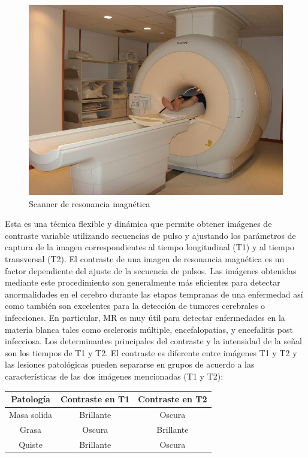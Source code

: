 \begin{figure}[h!]
\centering
\includegraphics[scale=0.3]{images/scanner.jpg}
\caption{Scanner de resonancia magnética}
\label{fig:scanner:mri}
\end{figure}

Esta es una técnica flexible y dinámica que permite obtener imágenes de contraste variable utilizando secuencias de pulso y ajustando los parámetros de captura de la imagen correspondientes al tiempo longitudinal (T1) y al tiempo transversal (T2). El contraste de una imagen de resonancia magnética es un factor dependiente del ajuste de la secuencia de pulsos. Las imágenes obtenidas mediante este procedimiento son generalmente más eficientes para detectar anormalidades en el cerebro durante las etapas tempranas de una enfermedad así como también son excelentes para la detección de tumores cerebrales o infecciones. En particular, MR es muy útil para detectar enfermedades en la materia blanca tales como esclerosis múltiple, encefalopatias, y encefalitis post infecciosa. Los determinantes principales del contraste y la intensidad de la señal son los tiempos de T1 y T2. El contraste es diferente entre imágenes T1 y T2 y las lesiones patológicas pueden separarse en grupos de acuerdo a las características de las dos imágenes mencionadas (T1 y T2):

\begin{table}[hp]
	\centering
	\begin{tabular}{c|c c}
	Patología & Contraste en T1 & Contraste en T2   \\ 
	\hline Masa solida & Brillante & Oscura  \\ 
	Grasa & Oscura & Brillante  \\ 
	Quiste &	Brillante &	Oscura  \\ 
	\end{tabular} 
\end{table}


